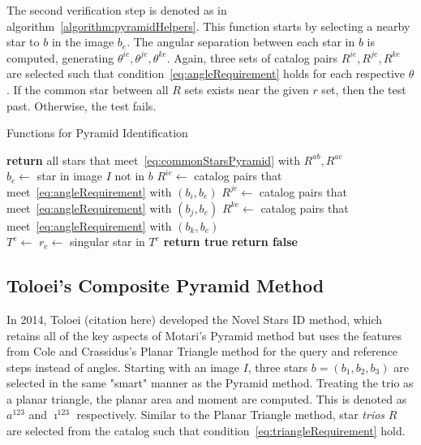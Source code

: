 
The second verification step is denoted as  in
algorithm~\ref{algorithm:pyramidHelpers}.
This function starts by selecting a nearby star to $b$ in the image $b_e$.
The angular separation between each star in $b$ is computed, generating $\theta^{ie}, \theta^{je},
\theta^{ke}$.
Again, three sets of catalog pairs $R^{ie}, R^{je}, R^{ke}$ are selected such that
condition~\eqref{eq:angleRequirement} holds for each respective $\theta$.
If the common star between all $R$ sets exists near the given $r$ set, then the test past.
Otherwise, the test fails.

\begin{algorithm}
    \caption{Functions for Pyramid Identification} \label{algorithm:pyramidHelpers}
    \begin{algorithmic}[1]
        \State \textbf{return} all stars that meet~\eqref{eq:commonStarsPyramid} with $R^{ab}, R^{ac}$
        \EndFunction
        \\
        \State $b_e \gets $ star in image $I$ not in $b$
        \State $R^{ie} \gets$ catalog pairs that meet~\eqref{eq:angleRequirement} with $(b_i, b_e)$
        \State $R^{je} \gets$ catalog pairs that meet~\eqref{eq:angleRequirement} with $(b_j, b_e)$
        \State $R^{ke} \gets$ catalog pairs that meet~\eqref{eq:angleRequirement} with $(b_k, b_e)$
        \\
        \State $T^e \gets $ 
        \State $r_e \gets $ singular star in $T^e$
        \State \textbf{return true}
        \EndIf
        \EndIf
        \State \textbf{return false}
        \EndFunction
    \end{algorithmic}
\end{algorithm}

\subsection{Toloei's Composite Pyramid Method}\label{subsec:toloei'sCompositePyramidMethod}
In 2014, Toloei (citation here) developed the Novel Stars ID method, which retains all of the key aspects of Motari's
Pyramid method but uses the features from Cole and Crassidus's Planar Triangle method for the query and reference steps
instead of angles.
Starting with an image $I$, three stars $b = (b_1, b_2, b_3)$ are selected in the same "smart" manner as the Pyramid
method.
Treating the trio as a planar triangle, the planar area and moment are computed.
This is denoted as $a^{123}$ and $\imath^{123}$ respectively.
Similar to the Planar Triangle method, star \textit{trios} $R$ are selected from the catalog such that
condition~\eqref{eq:triangleRequirement} hold.

